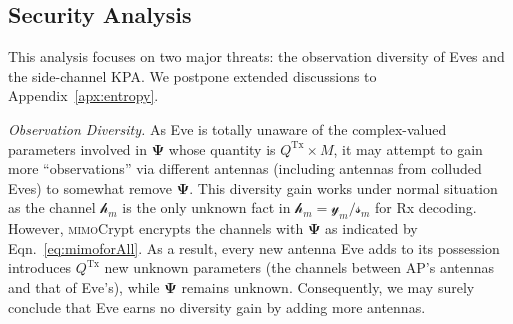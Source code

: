 \documentclass[conference,compsoc]{IEEEtran}
\newcommand{\name}{\textsc{mimo}Crypt\xspace}
\newcommand{\newrev}[1]{{\color{blue}#1}}    %
\newcommand{\newrev}[1]{#1}
\begin{document}
\subsection{Security Analysis} \label{ssec:secana}
\vspace{-1ex}
%
\newrev{
This analysis focuses on two major threats: the observation diversity of Eves 
and the side-channel KPA. We postpone extended discussions to Appendix~\ref{apx:entropy}.

\emph{Observation Diversity.}
%
As Eve is totally unaware of the complex-valued parameters involved in $\bm{\Psi}$ whose quantity is $Q^{\mathrm{Tx}}\times M$, it may attempt to gain more ``observations'' via different antennas (including antennas from colluded Eves) to somewhat remove $\bm{\Psi}$. This diversity gain works under normal situation as the channel $\mathcal{h}_{m}$ is the only unknown fact in $\mathcal{h}_{m} = \mathcal{y}_{m} / \mathcal{s}_{m}$ for Rx decoding. However, \name encrypts the channels with $\bm{\Psi}$ as indicated by Eqn.~\eqref{eq:mimoforAll}. As a result, 
every new antenna Eve adds to its possession introduces $Q^{\mathrm{Tx}}$ new unknown parameters (the channels between AP's antennas and that of Eve's), while $\bm{\Psi}$ remains unknown. Consequently, we may surely conclude that Eve earns no diversity gain by adding more antennas. 
%
%
%

}
\end{document}
